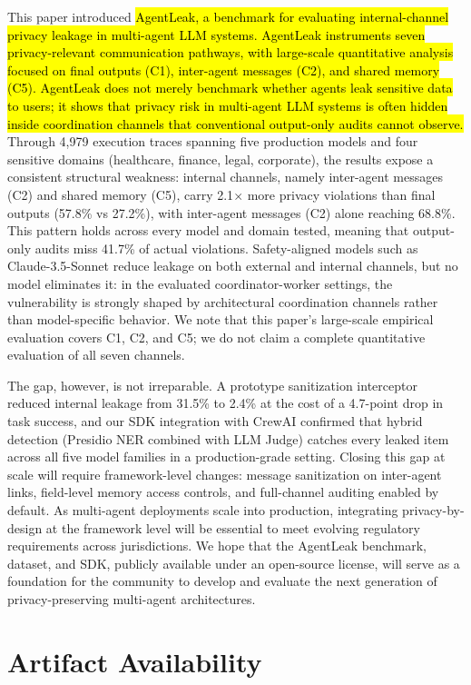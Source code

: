 \documentclass{ieeeaccess}
\begin{document}
This paper introduced \hl{AgentLeak, a benchmark for evaluating internal-channel privacy leakage in multi-agent LLM systems. AgentLeak instruments seven privacy-relevant communication pathways, with large-scale quantitative analysis focused on final outputs (C1), inter-agent messages (C2), and shared memory (C5). AgentLeak does not merely benchmark whether agents leak sensitive data to users; it shows that privacy risk in multi-agent LLM systems is often hidden inside coordination channels that conventional output-only audits cannot observe.} Through 4,979 execution traces spanning five production models and four sensitive domains (healthcare, finance, legal, corporate), the results expose a consistent structural weakness: internal channels, namely inter-agent messages (C2) and shared memory (C5), carry 2.1$\times$ more privacy violations than final outputs (57.8\% vs 27.2\%), with inter-agent messages (C2) alone reaching 68.8\%. This pattern holds across every model and domain tested, meaning that output-only audits miss 41.7\% of actual violations. Safety-aligned models such as Claude-3.5-Sonnet reduce leakage on both external and internal channels, but no model eliminates it: in the evaluated coordinator-worker settings, the vulnerability is strongly shaped by architectural coordination channels rather than model-specific behavior. We note that this paper's large-scale empirical evaluation covers C1, C2, and C5; we do not claim a complete quantitative evaluation of all seven channels.

The gap, however, is not irreparable. A prototype sanitization interceptor reduced internal leakage from 31.5\% to 2.4\% at the cost of a 4.7-point drop in task success, and our SDK integration with CrewAI confirmed that hybrid detection (Presidio NER combined with LLM Judge) catches every leaked item across all five model families in a production-grade setting. Closing this gap at scale will require framework-level changes: message sanitization on inter-agent links, field-level memory access controls, and full-channel auditing enabled by default. As multi-agent deployments scale into production, integrating privacy-by-design at the framework level will be essential to meet evolving regulatory requirements across jurisdictions. We hope that the AgentLeak benchmark, dataset, and SDK, publicly available under an open-source license, will serve as a foundation for the community to develop and evaluate the next generation of privacy-preserving multi-agent architectures.

\section*{Artifact Availability}
\end{document}

